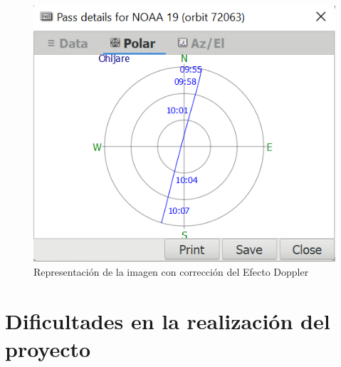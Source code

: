 \documentclass[a4paper,openright,12pt]{article}
\begin{document}
  \begin{figure}[hbtp]
 \centering
 \includegraphics[width = 17cm]{imagenes/noaa_19 pass 31_01.png}
 \caption{Representación de la imagen con corrección del Efecto Doppler}
 \label{apt_corrected}
 \end{figure}
 
 
 

 

\section{Dificultades en la realización del proyecto}
\end{document}
